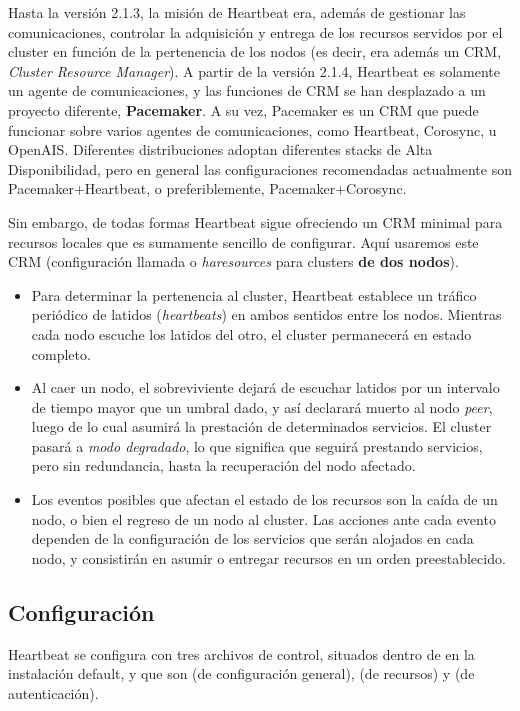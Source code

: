 Hasta la versión 2.1.3, la misión de Heartbeat era, además de gestionar las comunicaciones, controlar la adquisición y entrega de los recursos servidos por el cluster en función de la pertenencia de los nodos (es decir, era además un CRM, \textit{Cluster Resource Manager}). A partir de la versión 2.1.4, Heartbeat es solamente un agente de comunicaciones, y las funciones de CRM se han desplazado a un proyecto diferente, \textbf{Pacemaker}. A su vez, Pacemaker es un CRM que puede funcionar sobre varios agentes de comunicaciones, como Heartbeat, Corosync, u OpenAIS. Diferentes distribuciones adoptan diferentes stacks de Alta Disponibilidad, pero en general las configuraciones recomendadas actualmente son Pacemaker+Heartbeat, o preferiblemente, Pacemaker+Corosync. 

Sin embargo, de todas formas Heartbeat sigue ofreciendo un CRM minimal para recursos locales que es sumamente sencillo de configurar. Aquí usaremos este CRM (configuración llamada  o \textit{haresources} para clusters \textbf{de dos nodos}).

\begin{itemize}
	\item Para determinar la pertenencia al cluster, Heartbeat establece un tráfico periódico de latidos (\textit{heartbeats}) en ambos sentidos entre los nodos. Mientras cada nodo escuche los latidos del otro, el cluster permanecerá en estado completo.  

\item Al caer un nodo, el sobreviviente dejará de escuchar latidos por un intervalo de tiempo mayor que un umbral dado, y así declarará muerto al nodo \textit{peer}, luego de lo cual asumirá la prestación de determinados servicios. El cluster pasará a \textit{modo degradado}, lo que significa que seguirá prestando servicios, pero sin redundancia, hasta la recuperación del nodo afectado.
 
\item Los eventos posibles que afectan el estado de los recursos son la caída de un nodo, o bien el regreso de un nodo al cluster. Las acciones ante cada evento dependen de la configuración de los servicios que serán alojados en cada nodo, y consistirán en asumir o entregar recursos en un orden preestablecido. 

		\end{itemize}




\subsection{Configuración}
Heartbeat se configura con tres archivos de control, situados dentro de  en la instalación default, y que son  (de configuración general),  (de recursos) y  (de autenticación). 

